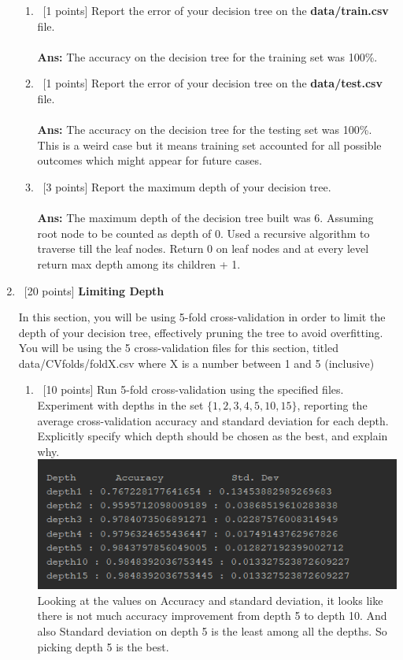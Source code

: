 \documentclass[12pt, fullpage,letterpaper]{article}
\begin{document}
\begin{enumerate}
\begin{enumerate}
        \item~[1 points] Report the error of your decision tree on the \textbf{data/train.csv} file.\\\\
        \textbf{Ans: }The accuracy on the decision tree for the training set was 100\%.
        \item~[1 points] Report the error of your decision tree on the \textbf{data/test.csv} file.\\\\
        \textbf{Ans: }The accuracy on the decision tree for the testing set was 100\%. This is a weird case but it means training set accounted for all possible outcomes which might appear for future cases.
        \item~[3 points] Report the maximum depth of your decision tree.\\\\
        \textbf{Ans: }The maximum depth of the decision tree built was 6. Assuming root node to be counted as depth of 0. Used a recursive algorithm to traverse till the leaf nodes. Return 0 on leaf nodes and at every level return max depth among its children + 1.  
    \end{enumerate}
    
    \item~[20 points] \textbf{Limiting Depth}

        In this section, you will be using 5-fold cross-validation in order to limit the depth of your decision tree, effectively pruning the tree to avoid overfitting.
        You will be using the 5 cross-validation files for this section, titled data/CVfolds/foldX.csv where X is a number between 1 and 5 (inclusive)
        \begin{enumerate}
            \item~[10 points] Run 5-fold cross-validation using the specified files.
            Experiment with depths in the set $\{1,2,3,4,5,10,15\}$, reporting the average cross-validation accuracy and standard deviation for each depth. Explicitly specify which depth should be chosen as the best, and explain why.\\
\includegraphics{ml_results.PNG}\\
Looking at the values on Accuracy and standard deviation, it looks like there is not much accuracy improvement from depth 5 to depth 10. And also Standard deviation on depth 5 is the least among all the depths. So picking depth 5 is the best.
            


\end{enumerate}
\end{enumerate}
\end{document}
